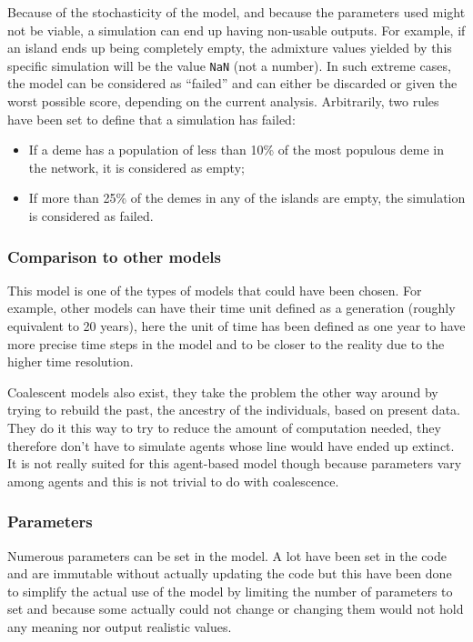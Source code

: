 \documentclass[a4paper,12pt]{report}
\begin{document}
Because of the stochasticity of the model, and because the parameters used might not be viable, a simulation can end up having non-usable outputs. For example, if an island ends up being completely empty, the admixture values yielded by this specific simulation will be the value \texttt{NaN} (not a number). In such extreme cases, the model can be considered as “failed” and can either be discarded or given the worst possible score, depending on the current analysis. Arbitrarily, two rules have been set to define that a simulation has failed:
\begin{itemize}
	\item If a deme has a population of less than 10\% of the most populous deme in the network, it is considered as empty;
	\item If more than 25\% of the demes in any of the islands are empty, the simulation is considered as failed.
\end{itemize}

\subsubsection{Comparison to other models}
This model is one of the types of models that could have been chosen. For example, other models can have their time unit defined as a generation (roughly equivalent to 20 years), here the unit of time has been defined as one year to have more precise time steps in the model and to be closer to the reality due to the higher time resolution.

Coalescent models also exist, they take the problem the other way around by trying to rebuild the past, the ancestry of the individuals, based on present data. They do it this way to try to reduce the amount of computation needed, they therefore don’t have to simulate agents whose line would have ended up extinct. It is not really suited for this agent-based model though because parameters vary among agents and this is not trivial to do with coalescence.

\subsubsection{Parameters}
Numerous parameters can be set in the model. A lot have been set in the code and are immutable without actually updating the code but this have been done to simplify the actual use of the model by limiting the number of parameters to set and because some actually could not change or changing them would not hold any meaning nor output realistic values.
\end{document}
